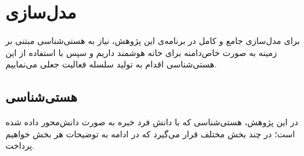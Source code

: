 \section{مدل‌سازی}\label{chapter:c44}

برای مدل‌سازی جامع و کامل در برنامه‌ی این پژوهش، نیاز به هستی‌شناسی مبتنی بر زمینه به صورت خاص‌دامنه برای خانه هوشمند داریم و سپس با استفاده از این هستی‌شناسی اقدام به تولید سلسله فعالیت جعلی می‌نماییم.

\subsection{هستی‌شناسی}

در این پژوهش، هستی‌شناسی که با دانش فرد خبره به صورت دانش‌محور داده شده است؛ در چند بخش مختلف قرار می‌گیرد که در ادامه به توضیحات هر بخش خواهیم پرداخت.

